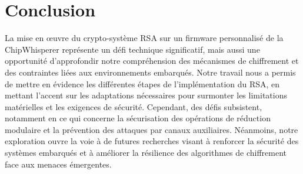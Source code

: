\documentclass[12pt]{article}
\begin{document}
\section*{Conclusion}
La mise en œuvre du crypto-système RSA sur un firmware personnalisé de la ChipWhisperer représente un défi technique significatif, mais aussi une opportunité d'approfondir notre compréhension des mécanismes de chiffrement et des contraintes liées aux environnements embarqués. Notre travail nous a permis de mettre en évidence les différentes étapes de l'implémentation du RSA, en mettant l'accent sur les adaptations nécessaires pour surmonter les limitations matérielles et les exigences de sécurité. Cependant, des défis subsistent, notamment en ce qui concerne la sécurisation des opérations de réduction modulaire et la prévention des attaques par canaux auxiliaires. Néanmoins, notre exploration ouvre la voie à de futures recherches visant à renforcer la sécurité des systèmes embarqués et à améliorer la résilience des algorithmes de chiffrement face aux menaces émergentes.

\medskip
\printbibliography
\end{document}
